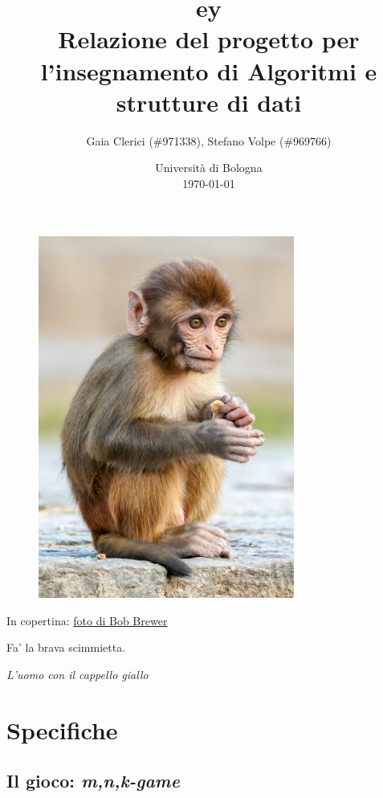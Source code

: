 \documentclass{article}
\title{
  {
    \fontspec[ Path = fonts/ ]{Symbola}
    \symbol{"1F17C}\symbol{"1F435}\symbol{"1F17D}\symbol{"1F17A}ey
  } \large \\
  \small Relazione del progetto per l'insegnamento di Algoritmi e strutture di
  dati
}
\author{
  Gaia Clerici (\#971338),
  Stefano Volpe (\#969766)
}
\date{
	Universit\`a di Bologna \\
  \today
}
\begin{document}
\maketitle
\thispagestyle{empty}

\begin{figure}[h]
  \includegraphics[width=0.75\textwidth]{monkey}
  \centering
\end{figure}

\pagebreak

\thispagestyle{empty}
\vspace*{\fill}

In copertina: \href{https://unsplash.com/photos/daC7ji1EMHM}{foto di
Bob Brewer}

\pagebreak

\tableofcontents

\pagebreak

\epigraph{Fa' la brava scimmietta.}{\textit{L'uomo con il cappello giallo}}

\section{Specifiche}

\subsection{Il gioco: \emph{m,n,k-game}}
\end{document}
